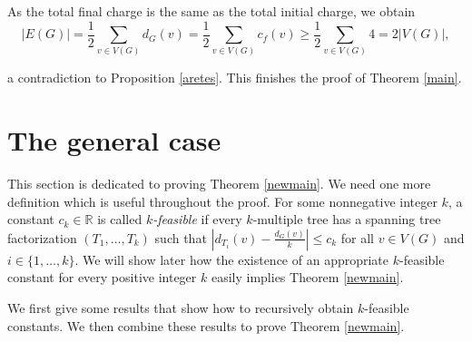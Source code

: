 \documentclass{article}
\theoremstyle{plain}
\theoremstyle{nonumberplain}
\theoremstyle{nonumberplain}
\newcommand{\stf}{spanning tree factorization }
\begin{document}
As the total final charge is the same as the total initial charge, we obtain
\begin{equation*}
|E(G)|=\frac{1}{2}\sum_{v \in V(G)}d_G(v)=\frac{1}{2}\sum_{v \in V(G)}c_f(v)\geq\frac{1}{2}\sum_{v \in V(G)}4=2|V(G)|,
\end{equation*}

a contradiction to Proposition \ref{aretes}. This finishes the proof of Theorem \ref{main}.

\section{The general case}\label{neu}

This section is dedicated to proving Theorem \ref{newmain}. We need one more definition which is useful throughout the proof.
For some nonnegative integer $k$, a constant $c_k \in \mathbb{R}$ is called {\it $k$-feasible} if every $k$-multiple tree has a \stf $(T_1,\ldots,T_k)$ such that $|d_{T_i}(v)-\frac{d_G(v)}{k}|\leq c_k$ for all $v \in V(G)$ and $i \in \{1,\ldots,k\}$. We will show later how the existence of an appropriate $k$-feasible constant for every positive integer $k$ easily implies Theorem \ref{newmain}.

We first give some results that show how to recursively obtain $k$-feasible constants. We then combine these results to prove Theorem \ref{newmain}.
\end{document}
